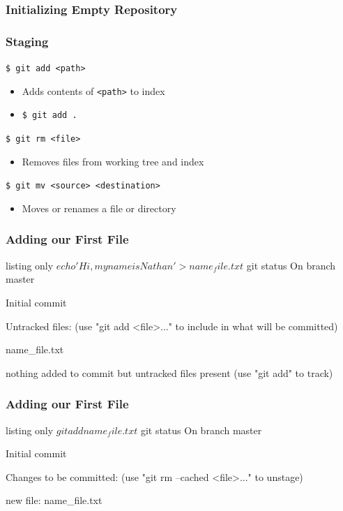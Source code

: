 \documentclass[english,compress]{beamer}
\begin{document}
\begin{frame}[fragile]
    \frametitle{Initializing Empty Repository}
\end{frame}

\begin{frame}[fragile]
    \frametitle{Staging}
    \verb|$ git add <path>|
    \begin{itemize}
        \item Adds contents of \verb|<path>| to index
        \item \verb|$ git add .|
    \end{itemize}
    
    \verb|$ git rm <file>|
    \begin{itemize}
        \item Removes files from working tree and index
    \end{itemize}

    \verb|$ git mv <source> <destination>|
    \begin{itemize}
        \item Moves or renames a file or directory
    \end{itemize}
\end{frame}

\begin{frame}[fragile]
    \frametitle{Adding our First File}
    \begin{tcblisting}{listing only}
$ echo 'Hi, my name is Nathan' > name_file.txt
$ git status
On branch master

Initial commit

Untracked files:
  (use "git add <file>..." to include in what will be committed)

	name_file.txt

nothing added to commit but untracked files present (use "git add" to track)
    \end{tcblisting}
\end{frame}

\begin{frame}[fragile]
    \frametitle{Adding our First File}
    \begin{tcblisting}{listing only}
$ git add name_file.txt
$ git status 
On branch master

Initial commit

Changes to be committed:
  (use "git rm --cached <file>..." to unstage)

	new file:   name_file.txt
    \end{tcblisting}
\end{frame}
\end{document}
